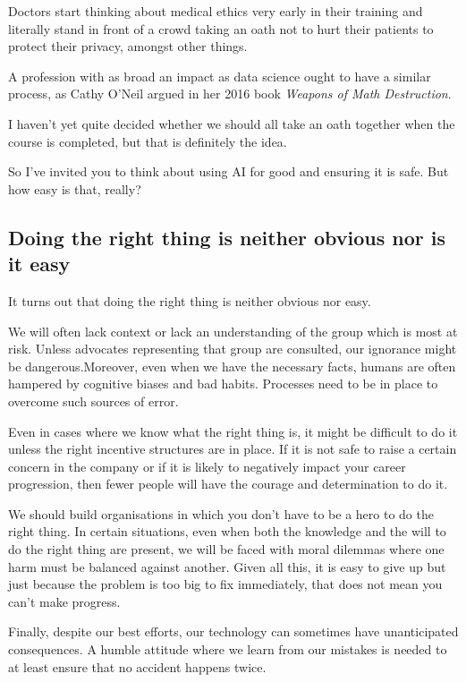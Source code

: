 \documentclass[
]{book}
\theoremstyle{definition}
\theoremstyle{definition}
\theoremstyle{definition}
\theoremstyle{definition}
\theoremstyle{remark}
\begin{document}
Doctors start thinking about medical ethics very early in their training and literally stand in front of a crowd taking an oath not to hurt their patients to protect their privacy, amongst other things.

A profession with as broad an impact as data science ought to have a similar process, as Cathy O'Neil argued in her 2016 book \emph{Weapons of Math Destruction}.

I haven't yet quite decided whether we should all take an oath together when the course is completed, but that is definitely the idea.

So I've invited you to think about using AI for good and ensuring it is safe. But how easy is that, really?

\hypertarget{doing-the-right-thing-is-neither-obvious-nor-is-it-easy}{%
\subsection{Doing the right thing is neither obvious nor is it easy}\label{doing-the-right-thing-is-neither-obvious-nor-is-it-easy}}

It turns out that doing the right thing is neither obvious nor easy.

We will often lack context or lack an understanding of the group which is most at risk. Unless advocates representing that group are consulted, our ignorance might be dangerous.Moreover, even when we have the necessary facts, humans are often hampered by cognitive biases and bad habits. Processes need to be in place to overcome such sources of error.

Even in cases where we know what the right thing is, it might be difficult to do it unless the right incentive structures are in place. If it is not safe to raise a certain concern in the company or if it is likely to negatively impact your career progression, then fewer people will have the courage and determination to do it.

We should build organisations in which you don't have to be a hero to do the right thing. In certain situations, even when both the knowledge and the will to do the right thing are present, we will be faced with moral dilemmas where one harm must be balanced against another. Given all this, it is easy to give up but just because the problem is too big to fix immediately, that does not mean you can't make progress.

Finally, despite our best efforts, our technology can sometimes have unanticipated consequences. A humble attitude where we learn from our mistakes is needed to at least ensure that no accident happens twice.
\end{document}
